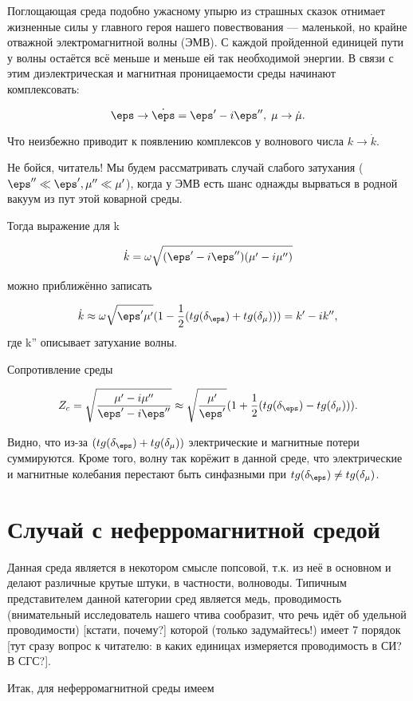Поглощающая среда подобно ужасному упырю из страшных сказок отнимает жизненные силы у главного героя
нашего повествования --- маленькой, но 
крайне отважной электромагнитной волны (ЭМВ). С каждой пройденной единицей пути у волны остаётся всё меньше и меньше
ей так необходимой энергии. В связи с этим диэлектрическая и магнитная проницаемости среды начинают комплексовать:

$$\eps \to \dot{\eps} = \eps'-i\eps'', \; \mu \to \dot{\mu}. $$

Что неизбежно приводит к появлению комплексов у волнового числа $k \to \dot{k}$.


Не бойся, читатель! Мы будем рассматривать случай слабого затухания ($\eps''\ll\eps', \mu''\ll \mu'$), когда 
 у ЭМВ есть шанс однажды вырваться в родной вакуум из пут этой коварной среды.


Тогда выражение для k 

$$\dot{k}=\omega \sqrt{(\eps'-i\eps'')(\mu'-i\mu'')} $$

можно приближённо записать

$$\dot{k} \approx \omega \sqrt{\eps'\mu'}(1-\frac{1}{2}(tg(\delta_{\eps})+tg(\delta_{\mu})))=k'-ik'', $$
где k'' описывает затухание волны.

Сопротивление среды 

$$Z_c=\sqrt{\frac{\mu'-i\mu''}{\eps'-i\eps''}} 
\approx \sqrt{\frac{\mu'}{\eps'}}(1+\frac{1}{2}(tg(\delta_{\eps})-tg(\delta_{\mu}))). $$

Видно, что из-за $(tg(\delta_{\eps})+tg(\delta_{\mu}))$ электрические и магнитные
потери суммируются. Кроме того, волну так корёжит в данной среде, что электрические и магнитные колебания
перестают быть синфазными при $tg(\delta_{\eps}) \ne tg(\delta_{\mu})$.

\section{Случай с неферромагнитной средой}

Данная среда является в некотором смысле попсовой, т.к. из неё в основном и делают различные 
крутые штуки, в частности, волноводы. Типичным представителем данной категории сред является медь, 
проводимость (внимательный исследователь нашего чтива сообразит, что речь идёт об удельной проводимости)
[кстати, почему?] которой (только задумайтесь!) имеет 7 порядок [тут сразу вопрос к читателю:
в каких единицах измеряется проводимость в СИ? В СГС?].


Итак, для неферромагнитной среды имеем

